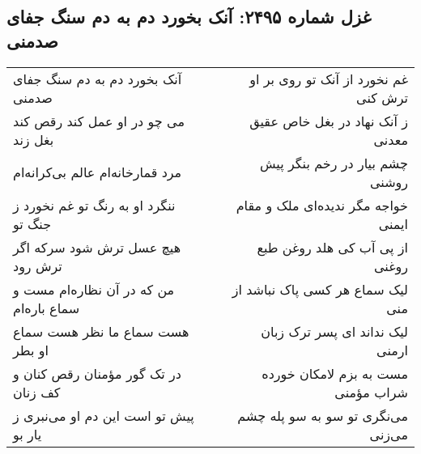 \begin{center}
\section*{غزل شماره ۲۴۹۵: آنک بخورد دم به دم سنگ جفای صدمنی}
\label{sec:2495}
\begin{longtable}{l p{0.5cm} r}
آنک بخورد دم به دم سنگ جفای صدمنی
&&
غم نخورد از آنک تو روی بر او ترش کنی
\\
می چو در او عمل کند رقص کند بغل زند
&&
ز آنک نهاد در بغل خاص عقیق معدنی
\\
مرد قمارخانه‌ام عالم بی‌کرانه‌ام
&&
چشم بیار در رخم بنگر پیش روشنی
\\
ننگرد او به رنگ تو غم نخورد ز جنگ تو
&&
خواجه مگر ندیده‌ای ملک و مقام ایمنی
\\
هیچ عسل ترش شود سرکه اگر ترش رود
&&
از پی آب کی هلد روغن طبع روغنی
\\
من که در آن نظاره‌ام مست و سماع باره‌ام
&&
لیک سماع هر کسی پاک نباشد از منی
\\
هست سماع ما نظر هست سماع او بطر
&&
لیک نداند ای پسر ترک زبان ارمنی
\\
در تک گور مؤمنان رقص کنان و کف زنان
&&
مست به بزم لامکان خورده شراب مؤمنی
\\
پیش تو است این دم او می‌نبری ز یار بو
&&
می‌نگری تو سو به سو پله چشم می‌زنی
\\
\end{longtable}
\end{center}
